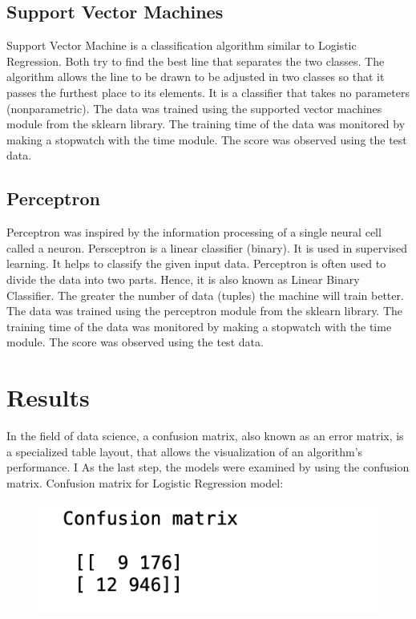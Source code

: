 \documentclass[onecolumn]{article}
\begin{document}
\subsection{Support Vector Machines}
Support Vector Machine is a classification algorithm similar to Logistic Regression. Both try to find the best line that separates the two classes. The algorithm allows the line to be drawn to be adjusted in two classes so that it passes the furthest place to its elements. It is a classifier that takes no parameters (nonparametric).
The data was trained using the supported vector machines module from the sklearn library.
The training time of the data was monitored by making a stopwatch with the time module.
The score was observed using the test data.
\subsection{Perceptron}
Perceptron was inspired by the information processing of a single neural cell called a neuron. Persceptron is a linear classifier (binary). It is used in supervised learning. It helps to classify the given input data. Perceptron is often used to divide the data into two parts. Hence, it is also known as Linear Binary Classifier. The greater the number of data (tuples) the machine will train better. 
The data was trained using the perceptron module from the sklearn library.
The training time of the data was monitored by making a stopwatch with the time module.
The score was observed using the test data.
\section{Results}


In the field of data science, a confusion matrix, also known as an error matrix, is a specialized table layout, that allows the visualization of an algorithm's performance. I As the last step, the models were examined by using the confusion matrix.
Confusion matrix for Logistic Regression model:
\begin{figure}[h!t]
\centering
    \includegraphics[width=.3\linewidth]{fig/conf_matrix.png}
\caption{\label{fig:dataset}
}
\end{figure}
\end{document}
